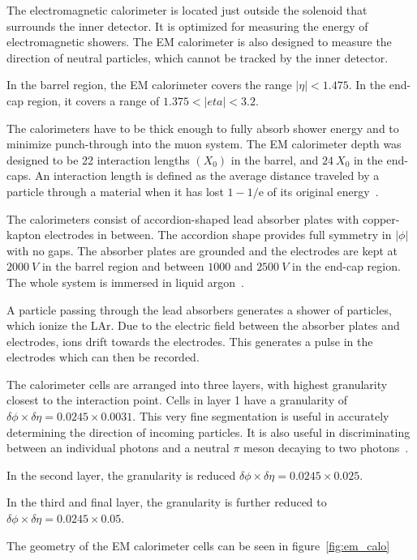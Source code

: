 The electromagnetic calorimeter is located just outside the solenoid that surrounds the inner detector.
It is optimized for measuring the energy of electromagnetic showers.
The EM calorimeter is also designed to measure the direction of neutral particles, which cannot be tracked by the inner detector.

In the barrel region, the EM calorimeter covers the range $|\eta| < 1.475$.
In the end-cap region, it covers a range of $1.375 < |eta| < 3.2$.

The calorimeters have to be thick enough to fully absorb shower energy and to minimize punch-through into the muon system.
The EM calorimeter depth was designed to be 22 interaction lengths $\left(X_0\right)$ in the barrel, and $24~X_0$ in the end-caps.
An interaction length is defined as the average distance traveled by a particle through a material when it has lost
$1 - 1/\mathrm{e}$ of its original energy~\cite{em-calo}.

The calorimeters consist of accordion-shaped lead absorber plates with copper-kapton electrodes in between.
The accordion shape provides full symmetry in $|\phi|$ with no gaps.
The absorber plates are grounded and the electrodes are kept at $2000~V$ in the barrel region and between
$1000$ and $2500~V$ in the end-cap region.
The whole system is immersed in liquid argon~\cite{atlas-detector-2008}.

A particle passing through the lead absorbers generates a shower of particles, which ionize the LAr.
Due to the electric field between the absorber plates and electrodes, ions drift towards the electrodes.
This generates a pulse in the electrodes which can then be recorded.

The calorimeter cells are arranged into three layers, with highest granularity closest to the interaction point.
Cells in layer 1 have a granularity of $\delta\phi \times \delta\eta = 0.0245 \times 0.0031$.
This very fine segmentation is useful in accurately determining the direction of incoming particles.
It is also useful in discriminating between an individual photons and a neutral $\pi$ meson decaying to two photons~\cite{em-calo}.

In the second layer, the granularity is reduced $\delta\phi \times \delta\eta = 0.0245 \times 0.025$.

In the third and final layer, the granularity is further reduced to $\delta\phi \times \delta\eta = 0.0245 \times 0.05$.

The geometry of the EM calorimeter cells can be seen in figure~\ref{fig:em_calo}

